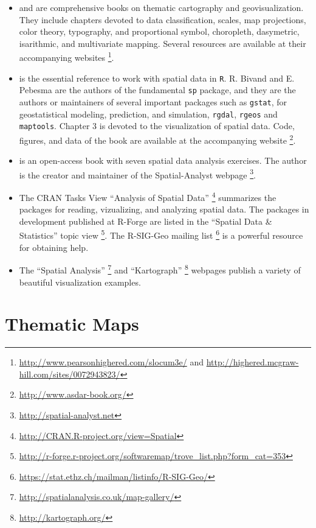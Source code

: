 \documentclass[smallroyalvopaper]{memoir}
\begin{document}
\begin{itemize}
\item \cite{Slocum.McMaster.ea2005} and \cite{Dent.Torguson.ea2008} are comprehensive books on thematic cartography and geovisualization.  They include chapters devoted to data classification, scales, map projections, color theory, typography, and proportional symbol, choropleth, dasymetric, isarithmic, and multivariate mapping. Several resources are available at their accompanying websites \footnote{\url{http://www.pearsonhighered.com/slocum3e/} and
\url{http://highered.mcgraw-hill.com/sites/0072943823/}}.

\item \cite{Bivand.Pebesma.ea2008} is the essential reference to work with spatial data in \texttt{R}. R. Bivand and E. Pebesma are the authors of the fundamental \texttt{sp} package, and they are the authors or maintainers of several important packages such as \texttt{gstat}, for geostatistical modeling, prediction, and simulation, \texttt{rgdal}, \texttt{rgeos} and \texttt{maptools}. Chapter 3 is devoted to the visualization of spatial data. Code, figures, and data of the book are available at the accompanying website \footnote{\url{http://www.asdar-book.org/}}.

\item \cite{Hengl2009} is an open-access book with seven spatial data analysis exercises. The author is the creator and maintainer of the Spatial-Analyst webpage \footnote{\url{http://spatial-analyst.net}}.

\item The CRAN Tasks View ``Analysis of Spatial Data'' \footnote{\url{http://CRAN.R-project.org/view=Spatial}} summarizes the packages for reading, vizualizing, and analyzing spatial data. The packages in development published at R-Forge are listed in the ``Spatial Data \& Statistics'' topic view \footnote{\url{http://r-forge.r-project.org/softwaremap/trove\_list.php?form\_cat=353}}. The R-SIG-Geo mailing list \footnote{\url{https://stat.ethz.ch/mailman/listinfo/R-SIG-Geo/}} is a powerful resource for obtaining help.

\item The ``Spatial Analysis'' \footnote{\url{http://spatialanalysis.co.uk/map-gallery/}} and ``Kartograph'' \footnote{\url{http://kartograph.org/}} webpages publish a variety of beautiful visualization examples.
\end{itemize}

\chapter{Thematic Maps}
\label{sec:org6a1e042}
\label{cha:thematicMaps}
\end{document}
